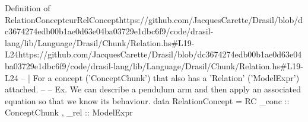 \begin{haskell}{Definition of RelationConcept}{curRelConcept}{https://github.com/JacquesCarette/Drasil/blob/dc3674274edb00b1ae0d63e04ba03729e1dbc\linebreak{}6f9/code/drasil-lang/lib/Language/Drasil/Chunk/Relation.hs\#L19-L24}{https://github.com/JacquesCarette/Drasil/blob/dc3674274edb00b1ae0d63e04ba03729e1dbc6f9/code/drasil-lang/lib/Language/Drasil/Chunk/Relation.hs\#L19-L24}
-- | For a concept ('ConceptChunk') that also has a 'Relation' ('ModelExpr') attached.
--
-- Ex. We can describe a pendulum arm and then apply an associated equation so that we know its behaviour.
data RelationConcept = RC { _conc :: ConceptChunk
                          , _rel  :: ModelExpr
                          }
\end{haskell}

